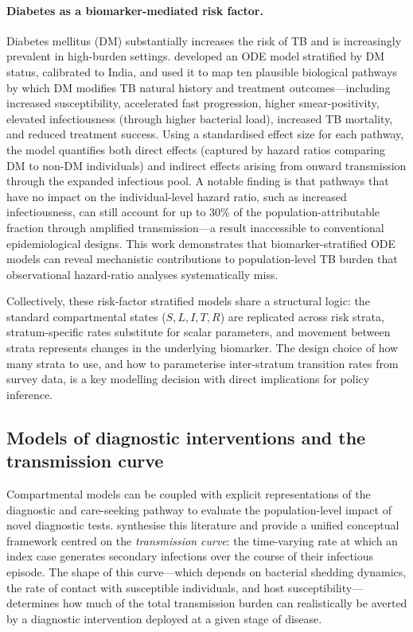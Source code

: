 \documentclass[11pt]{article}
\begin{document}
\paragraph{Diabetes as a biomarker-mediated risk factor.}
Diabetes mellitus (DM) substantially increases the risk of TB and is increasingly prevalent in high-burden settings. \citet{awad2019diabetes} developed an ODE model stratified by DM status, calibrated to India, and used it to map ten plausible biological pathways by which DM modifies TB natural history and treatment outcomes---including increased susceptibility, accelerated fast progression, higher smear-positivity, elevated infectiousness (through higher bacterial load), increased TB mortality, and reduced treatment success. Using a standardised effect size for each pathway, the model quantifies both direct effects (captured by hazard ratios comparing DM to non-DM individuals) and indirect effects arising from onward transmission through the expanded infectious pool. A notable finding is that pathways that have no impact on the individual-level hazard ratio, such as increased infectiousness, can still account for up to 30\% of the population-attributable fraction through amplified transmission---a result inaccessible to conventional epidemiological designs. This work demonstrates that biomarker-stratified ODE models can reveal mechanistic contributions to population-level TB burden that observational hazard-ratio analyses systematically miss.

Collectively, these risk-factor stratified models share a structural logic: the standard compartmental states ($S, L, I, T, R$) are replicated across risk strata, stratum-specific rates substitute for scalar parameters, and movement between strata represents changes in the underlying biomarker. The design choice of how many strata to use, and how to parameterise inter-stratum transition rates from survey data, is a key modelling decision with direct implications for policy inference.

\subsection{Models of diagnostic interventions and the transmission curve}

Compartmental models can be coupled with explicit representations of the diagnostic and care-seeking pathway to evaluate the population-level impact of novel diagnostic tests. \citet{zwerling2015modelling} synthesise this literature and provide a unified conceptual framework centred on the \emph{transmission curve}: the time-varying rate at which an index case generates secondary infections over the course of their infectious episode. The shape of this curve---which depends on bacterial shedding dynamics, the rate of contact with susceptible individuals, and host susceptibility---determines how much of the total transmission burden can realistically be averted by a diagnostic intervention deployed at a given stage of disease.
\end{document}
